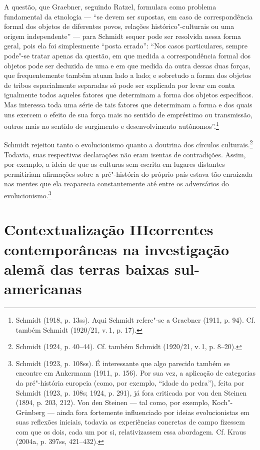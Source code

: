 A questão, que Graebner, seguindo Ratzel, formulara como problema
fundamental da etnologia --- ``se devem ser supostas, em caso de
correspondência formal dos objetos de diferentes povos, relações
histórico"-culturais ou uma origem independente'' --- para Schmidt sequer
pode ser resolvida nessa forma geral, pois ela foi simplesmente ``posta
errado'': ``Nos casos particulares, sempre pode"-se tratar apenas da
questão, em que medida a correspondência formal dos objetos pode ser
deduzida de uma e em que medida da outra dessas duas forças, que
frequentemente também atuam lado a lado; e sobretudo a forma dos objetos
de tribos espacialmente separadas só pode ser explicada por levar em
conta igualmente todos aqueles fatores que determinam a forma dos
objetos específicos. Mas interessa toda uma série de tais fatores que
determinam a forma e dos quais uns exercem o efeito de sua força mais no
sentido de empréstimo ou transmissão, outros mais no sentido de
surgimento e desenvolvimento autônomos''.\footnote{Schmidt (1918, p.
  13ss). Aqui Schmidt refere"-se a Graebner (1911, p. 94). Cf. também
  Schmidt (1920/21, v.\,1, p. 17).}

Schmidt rejeitou tanto o evolucionismo quanto a doutrina dos círculos
culturais.\footnote{Schmidt (1924, p. 40--44). Cf. também Schmidt
  (1920/21, v.\,1, p. 8--20).} Todavia, suas respectivas declarações não
eram isentas de contradições. Assim, por exemplo, a ideia de que as
culturas sem escrita em lugares distantes permitiriam afirmações sobre a
pré"-história do próprio país estava tão enraizada nas mentes que ela
reaparecia constantemente até entre os adversários do
evolucionismo.\footnote{Schmidt (1923, p. 108ss). É interessante que
  algo parecido também se encontre em Ankermann (1911, p. 156). Por sua
  vez, a aplicação de categorias da pré"-história europeia (como, por
  exemplo, ``idade da pedra''), feita por Schmidt (1923, p. 108s; 1924,
  p. 291), já fora criticada por von den Steinen (1894, p. 203, 212).
  Von den Steinen --- tal como, por exemplo, Koch"-Grünberg --- ainda fora
  fortemente influenciado por ideias evolucionistas em suas reflexões
  iniciais, todavia as experiências concretas de campo fizessem com que
  os dois, cada um por si, relativizassem essa abordagem. Cf. Kraus
  (2004a, p. 397ss, 421--432).}

\section{Contextualização III\break correntes contemporâneas na investigação\break
alemã das terras baixas sul-americanas}

